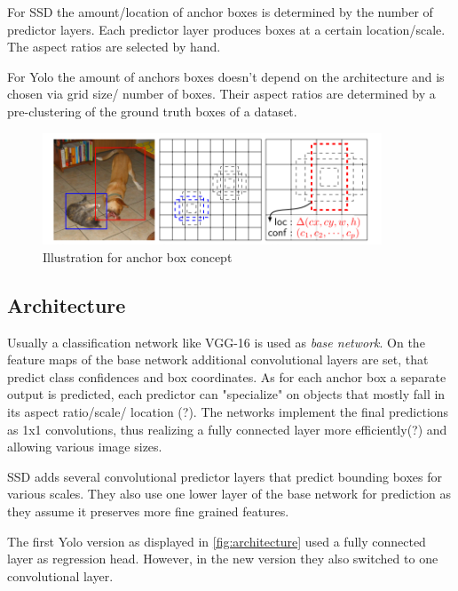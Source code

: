 \documentclass{article}
\begin{document}
	For SSD the amount/location of anchor boxes is determined by the number of predictor layers. Each predictor layer produces boxes at a certain location/scale. The aspect ratios are selected by hand. 
	
	For Yolo the amount of anchors boxes doesn't depend on the architecture and is chosen via grid size/ number of boxes. Their aspect ratios are determined by a pre-clustering of the ground truth boxes of a dataset.
	\begin{figure}[h]
		\centering
		\includegraphics[width=0.9\textwidth]{fig/anchors}
		\caption{Illustration for anchor box concept \cite{Liu}}
		\label{fig:anchors}
	\end{figure}
	\subsection{Architecture}
	
	Usually a classification network like VGG-16 is used as \textit{base network}. On the feature maps of the base network additional convolutional layers are set, that predict class confidences and box coordinates. As for each anchor box a separate output is predicted, each predictor can "specialize" on objects that mostly fall in its aspect ratio/scale/ location (?). The networks implement the final predictions as 1x1 convolutions, thus realizing a fully connected layer more efficiently(?) and allowing various image sizes.
	
	SSD adds several convolutional predictor layers that predict bounding boxes for various scales. They also use one lower layer of the base network for prediction as they assume it preserves more fine grained features.
	
	The first Yolo version as displayed in \autoref{fig:architecture} used a fully connected layer as regression head. However, in the new version they also switched to one convolutional layer.
	
\end{document}
